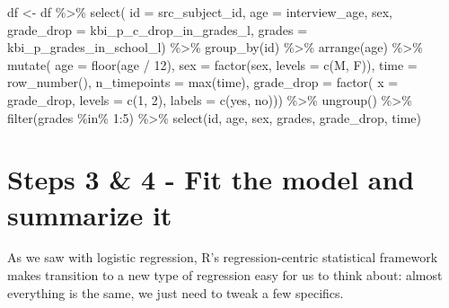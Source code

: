 \documentclass[
]{book}
\newenvironment{Shaded}{\begin{snugshade}}{\end{snugshade}}
\newcommand{\AttributeTok}[1]{\textcolor[rgb]{0.77,0.63,0.00}{#1}}
\newcommand{\DecValTok}[1]{\textcolor[rgb]{0.00,0.00,0.81}{#1}}
\newcommand{\FunctionTok}[1]{\textcolor[rgb]{0.00,0.00,0.00}{#1}}
\newcommand{\NormalTok}[1]{#1}
\newcommand{\OtherTok}[1]{\textcolor[rgb]{0.56,0.35,0.01}{#1}}
\newcommand{\SpecialCharTok}[1]{\textcolor[rgb]{0.00,0.00,0.00}{#1}}
\newcommand{\StringTok}[1]{\textcolor[rgb]{0.31,0.60,0.02}{#1}}
\begin{document}
\begin{Shaded}
\begin{Highlighting}[]
\NormalTok{df }\OtherTok{\textless{}{-}}\NormalTok{ df }\SpecialCharTok{\%\textgreater{}\%} 
  \FunctionTok{select}\NormalTok{(}
    \AttributeTok{id =}\NormalTok{ src\_subject\_id, }
    \AttributeTok{age =}\NormalTok{ interview\_age,}
\NormalTok{    sex, }
    \AttributeTok{grade\_drop =}\NormalTok{ kbi\_p\_c\_drop\_in\_grades\_l,}
    \AttributeTok{grades =}\NormalTok{ kbi\_p\_grades\_in\_school\_l) }\SpecialCharTok{\%\textgreater{}\%} 
  \FunctionTok{group\_by}\NormalTok{(id) }\SpecialCharTok{\%\textgreater{}\%} 
  \FunctionTok{arrange}\NormalTok{(age) }\SpecialCharTok{\%\textgreater{}\%} 
  \FunctionTok{mutate}\NormalTok{(}
    \AttributeTok{age =} \FunctionTok{floor}\NormalTok{(age }\SpecialCharTok{/} \DecValTok{12}\NormalTok{),}
    \AttributeTok{sex =} \FunctionTok{factor}\NormalTok{(sex, }\AttributeTok{levels =} \FunctionTok{c}\NormalTok{(}\StringTok{\textquotesingle{}M\textquotesingle{}}\NormalTok{, }\StringTok{\textquotesingle{}F\textquotesingle{}}\NormalTok{)),}
    \AttributeTok{time =} \FunctionTok{row\_number}\NormalTok{(),}
    \AttributeTok{n\_timepoints =} \FunctionTok{max}\NormalTok{(time),}
    \AttributeTok{grade\_drop =} \FunctionTok{factor}\NormalTok{(}
      \AttributeTok{x =}\NormalTok{ grade\_drop, }
      \AttributeTok{levels =} \FunctionTok{c}\NormalTok{(}\DecValTok{1}\NormalTok{, }\DecValTok{2}\NormalTok{), }
      \AttributeTok{labels =} \FunctionTok{c}\NormalTok{(}\StringTok{\textquotesingle{}yes\textquotesingle{}}\NormalTok{, }\StringTok{\textquotesingle{}no\textquotesingle{}}\NormalTok{))) }\SpecialCharTok{\%\textgreater{}\%}
  \FunctionTok{ungroup}\NormalTok{() }\SpecialCharTok{\%\textgreater{}\%} 
  \FunctionTok{filter}\NormalTok{(grades }\SpecialCharTok{\%in\%} \DecValTok{1}\SpecialCharTok{:}\DecValTok{5}\NormalTok{) }\SpecialCharTok{\%\textgreater{}\%} 
  \FunctionTok{select}\NormalTok{(id, age, sex, grades, grade\_drop, time)}
\end{Highlighting}
\end{Shaded}

\hypertarget{steps-3-4---fit-the-model-and-summarize-it-2}{%
\section{Steps 3 \& 4 - Fit the model and summarize it}\label{steps-3-4---fit-the-model-and-summarize-it-2}}

As we saw with logistic regression, R's regression-centric statistical framework makes transition to a new type of regression easy for us to think about: almost everything is the same, we just need to tweak a few specifics.
\end{document}
